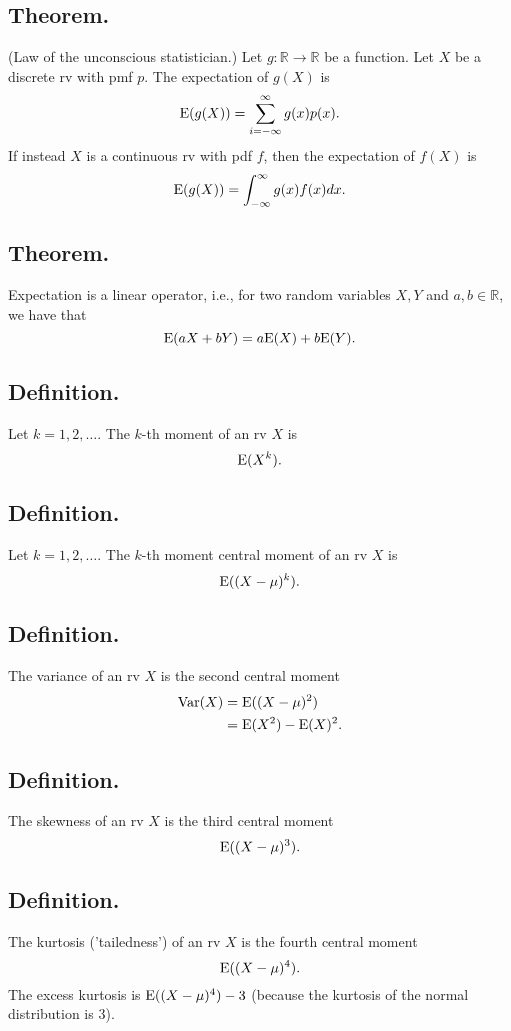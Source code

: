 \documentclass[titlepage]{article}
\begin{document}
\subsection{Theorem.} (Law of the unconscious statistician.) Let $g: \mathbb{R} \to \mathbb{R}$ be a function. Let $X$ be a discrete rv with pmf $p$. The expectation of $g(X)$ is 
$$\text{E}(g(X)) = \sum_{i=-\infty}^{\infty}g(x)p(x).$$
If instead $X$ is a continuous rv with pdf $f$, then the expectation of $f(X)$ is
$$\text{E}(g(X)) = \int_{-\infty}^{\infty}g(x)f(x)dx.$$

\subsection{Theorem.} Expectation is a linear operator, i.e., for two random variables $X, Y$ and $a, b \in \mathbb{R}$, we have that 
$$\text{E}(aX + bY) = a\text{E}(X) + b\text{E}(Y).$$

\subsection{Definition.} Let $k = 1, 2, \ldots$. The $k$-th moment of an rv $X$ is 
$$\text{E}(X^{k}).$$

\subsection{Definition.} Let $k = 1, 2, \ldots$. The $k$-th moment central moment of an rv $X$ is 
$$\text{E}((X-\mu)^{k}).$$

\subsection{Definition.} The variance of an rv $X$ is the second central moment 
\begin{align*}
    \text{Var}(X) &= \text{E}((X-\mu)^{2}) \\
            &= \text{E}(X^{2}) - \text{E}(X)^{2}.
\end{align*}

\subsection{Definition.} The skewness of an rv $X$ is the third central moment 
$$\text{E}((X-\mu)^{3}).$$

\subsection{Definition.} The kurtosis ('tailedness') of an rv $X$ is the fourth central moment 
$$\text{E}((X-\mu)^{4}).$$
The excess kurtosis is $\text{E}((X-\mu)^{4}) - 3$ (because the kurtosis of the normal distribution is $3$).
\end{document}
